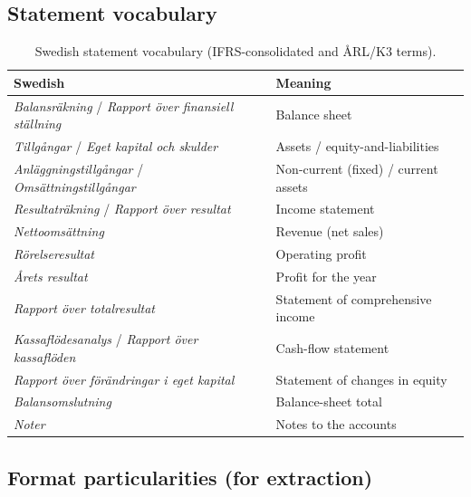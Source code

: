 \documentclass[11pt,a4paper]{report}
\begin{document}
\subsection{Statement vocabulary}

\begin{table}[h]
\centering
\caption{Swedish statement vocabulary (IFRS-consolidated and ÅRL/K3 terms).}
\label{tab:se-vocab}
\small
\begin{tabular}{@{}p{}p{}@{}}
\toprule
\textbf{Swedish} & \textbf{Meaning} \\
\midrule
\emph{Balansr\"akning} / \emph{Rapport \"over finansiell st\"allning} & Balance sheet \\
\emph{Tillg\aa ngar} / \emph{Eget kapital och skulder} & Assets / equity-and-liabilities \\
\emph{Anl\"aggningstillg\aa ngar} / \emph{Oms\"attningstillg\aa ngar} & Non-current (fixed) / current assets \\
\emph{Resultatr\"akning} / \emph{Rapport \"over resultat} & Income statement \\
\emph{Nettooms\"attning} & Revenue (net sales) \\
\emph{R\"orelseresultat} & Operating profit \\
\emph{\AA rets resultat} & Profit for the year \\
\emph{Rapport \"over totalresultat} & Statement of comprehensive income \\
\emph{Kassafl\"odesanalys} / \emph{Rapport \"over kassafl\"oden} & Cash-flow statement \\
\emph{Rapport \"over f\"or\"andringar i eget kapital} & Statement of changes in equity \\
\emph{Balansomslutning} & Balance-sheet total \\
\emph{Noter} & Notes to the accounts \\
\bottomrule
\end{tabular}
\end{table}

\subsection{Format particularities (for extraction)}
\end{document}
